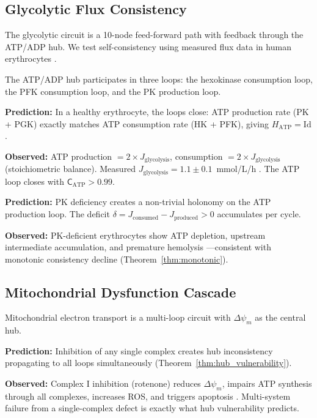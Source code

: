 \documentclass[10pt,twocolumn,a4paper]{article}
\theoremstyle{plain}
\theoremstyle{definition}
\theoremstyle{remark}
\newcommand{\consist}{\mathsf{C}}
\begin{document}
\subsection{Glycolytic Flux Consistency}

The glycolytic circuit is a 10-node feed-forward path with feedback through the ATP/ADP hub. We test self-consistency using measured flux data in human erythrocytes \citep{rapoport1976,mulquiney1999}.

The ATP/ADP hub participates in three loops: the hexokinase consumption loop, the PFK consumption loop, and the PK production loop.

\textbf{Prediction:} In a healthy erythrocyte, the loops close: ATP production rate (PK + PGK) exactly matches ATP consumption rate (HK + PFK), giving $H_{\mathrm{ATP}} = \mathrm{Id}$.

\textbf{Observed:} ATP production $= 2 \times J_{\mathrm{glycolysis}}$, consumption $= 2 \times J_{\mathrm{glycolysis}}$ (stoichiometric balance). Measured $J_{\mathrm{glycolysis}} = 1.1 \pm 0.1$~mmol/L/h \citep{rapoport1976}. The ATP loop closes with $\consist_{\mathrm{ATP}} > 0.99$.

\textbf{Prediction:} PK deficiency creates a non-trivial holonomy on the ATP production loop. The deficit $\delta = J_{\mathrm{consumed}} - J_{\mathrm{produced}} > 0$ accumulates per cycle.

\textbf{Observed:} PK-deficient erythrocytes show ATP depletion, upstream intermediate accumulation, and premature hemolysis \citep{zanella2005}---consistent with monotonic consistency decline (Theorem~\ref{thm:monotonic}).

\subsection{Mitochondrial Dysfunction Cascade}

Mitochondrial electron transport is a multi-loop circuit with $\Delta\psi_m$ as the central hub.

\textbf{Prediction:} Inhibition of any single complex creates hub inconsistency propagating to all loops simultaneously (Theorem~\ref{thm:hub_vulnerability}).

\textbf{Observed:} Complex I inhibition (rotenone) reduces $\Delta\psi_m$, impairs ATP synthesis through all complexes, increases ROS, and triggers apoptosis \citep{li2003}. Multi-system failure from a single-complex defect is exactly what hub vulnerability predicts.
\end{document}
